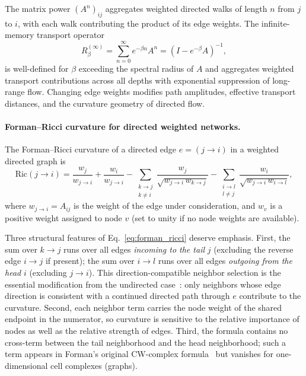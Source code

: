 \documentclass[aps,superscriptaddress,11pt]{revtex4-2}
\theoremstyle{definition}
\theoremstyle{plain}
\begin{document}
The matrix power $(A^n)_{ij}$ aggregates weighted directed walks of
length $n$ from $j$ to $i$, with each walk contributing the product of
its edge weights.  The infinite-memory transport operator
\begin{equation}
  R_\beta^{(\infty)}
  = \sum_{n=0}^{\infty}e^{-\beta n}A^n
  = (I - e^{-\beta}A)^{-1},
  \label{eq:Rbeta}
\end{equation}
is well-defined for $\beta$ exceeding the spectral radius of $A$ and
aggregates weighted transport contributions across all depths with
exponential suppression of long-range flow.  Changing edge weights
modifies path amplitudes, effective transport distances, and the
curvature geometry of directed flow.

\paragraph*{Forman--Ricci curvature for directed weighted networks.}

The Forman--Ricci curvature of a directed edge $e = (j\to i)$ in a
weighted directed graph is~\cite{Sreejith2016,Weber2017,Saucan2017}
\begin{equation}
  \mathrm{Ric}(j\to i)
  = \frac{w_j}{w_{j\to i}}
    + \frac{w_i}{w_{j\to i}}
    - \sum_{\substack{k\to j \\ k\neq i}}
        \frac{w_j}{\sqrt{w_{j\to i}\,w_{k\to j}}}
    - \sum_{\substack{i\to l \\ l\neq j}}
        \frac{w_i}{\sqrt{w_{j\to i}\,w_{i\to l}}},
  \label{eq:forman_ricci}
\end{equation}
where $w_{j\to i}=A_{ij}$ is the weight of the edge under
consideration, and $w_v$ is a positive weight assigned to node $v$
(set to unity if no node weights are available).

Three structural features of Eq.~\eqref{eq:forman_ricci} deserve
emphasis.  First, the sum over $k\to j$ runs over all edges
\emph{incoming to the tail} $j$ (excluding the reverse edge $i\to j$
if present); the sum over $i\to l$ runs over all edges \emph{outgoing
from the head} $i$ (excluding $j\to i$).  This direction-compatible
neighbor selection is the essential modification from the undirected
case~\cite{Sreejith2016}: only neighbors whose edge direction is
consistent with a continued directed path through $e$ contribute to
the curvature.  Second, each neighbor term carries the node weight of
the shared endpoint in the numerator, so curvature is sensitive to the
relative importance of nodes as well as the relative strength of edges.
Third, the formula contains no cross-term between the tail neighborhood
and the head neighborhood; such a term appears in Forman's original
CW-complex formula~\cite{Forman2003} but vanishes for one-dimensional
cell complexes (graphs).
\end{document}
